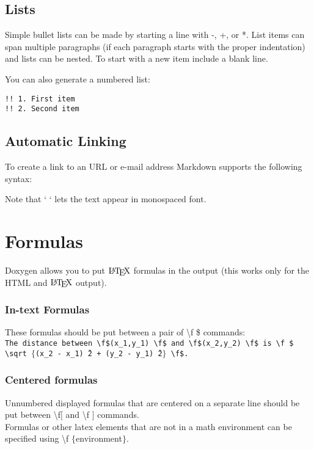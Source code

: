 \documentclass[a4paper,11pt,headsepline]{scrartcl}
\begin{document}
\subsection{Lists}
Simple bullet lists can be made by starting a line with -, +, or *. List items can span multiple paragraphs (if each paragraph starts with the proper indentation) and lists can be nested. To start with a new item include a blank line.

You can also generate a numbered list:
\lstset{language=Fortran}
\begin{lstlisting}
!! 1. First item
!! 2. Second item
\end{lstlisting}
\subsection{Automatic Linking}
To create a link to an URL or e-mail address Markdown supports the following syntax:

Note that ` `   lets the text appear in monospaced font.
\section{Formulas}
Doxygen allows you to put $\mbox{\LaTeX}$ formulas in the output (this works only for the HTML and $\mbox{\LaTeX}$ output).
\subsubsection*{In-text Formulas}
These formulas should be put between a pair of \textbackslash f \$ commands:\\
\texttt{The distance between \textbackslash f\$(x\_1,y\_1) \textbackslash f\$ and \textbackslash f\$(x\_2,y\_2) \textbackslash f\$ is
  \textbackslash f \$ \textbackslash sqrt $\lbrace$(x\_2 - x\_1)\^\ 2 + (y\_2 - y\_1)\^\ 2$\rbrace$ \textbackslash f\$.}
 \subsubsection*{Centered formulas} 
Unnumbered displayed formulas that are centered on a separate line should be put between \textbackslash f$\lbrack$ and \textbackslash f $\rbrack$ commands. \\
Formulas or other latex elements that are not in a math environment can be specified using \textbackslash f $\lbrace$environment$\rbrace$.
\end{document}
